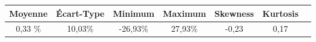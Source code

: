 \begin{tabular}{ccccccc}
    \toprule
    Moyenne & Écart-Type & Minimum & Maximum & Skewness & Kurtosis \\
    \midrule
    0,33 \% & 10,03\% & -26,93\%  & 27,93\% & -0,23 & 0,17 \\
    \bottomrule
\end{tabular}

